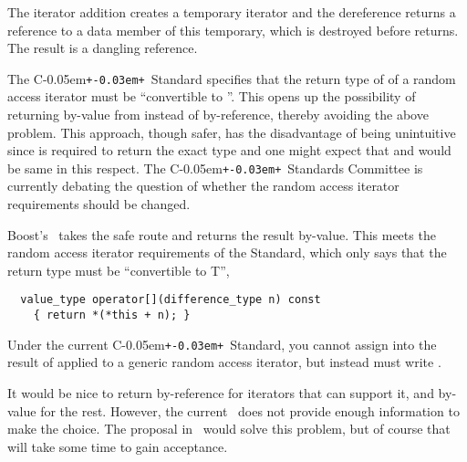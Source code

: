 \documentclass{netobjectdays}
\newcommand{\Cpp}{C\kern-0.05em\texttt{+\kern-0.03em+}}
\newcommand{\iteratoradaptor}{\code{iterator\_\-adaptor}}
\newcommand{\iteratortraits}{\code{iterator\_\-traits}}
\begin{document}
\noindent The iterator addition creates a temporary iterator and the
dereference returns a reference to a data member of this temporary,
which is destroyed before  returns. The result is a
dangling reference.

The \Cpp\ Standard specifies that the return type of 
of a random access iterator must be ``convertible to ''.  This
opens up the possibility of returning by-value from 
instead of by-reference, thereby avoiding the above problem.  This
approach, though safer, has the disadvantage of being unintuitive
since  is required to return the exact type 
and one might expect that  and  would
be same in this respect.  The \Cpp\ Standards Committee is currently
debating the question of whether the random access iterator
requirements should be changed.

Boost's \iteratoradaptor\ takes the safe route and returns the result
by-value. This meets the random access iterator requirements of the
Standard, which only says that the return type must be ``convertible
to T'',

{\footnotesize
\begin{verbatim}
  value_type operator[](difference_type n) const
    { return *(*this + n); }
\end{verbatim}
}

Under the current \Cpp\ Standard, you cannot assign into the result of
 applied to a generic random access iterator,
but instead must write .

It would be nice to return by-reference for iterators that can support
it, and by-value for the rest. However, the current \iteratortraits\
does not provide enough information to make the choice. The proposal
in~\cite{siek01:_improved_iter_cat} would solve this problem, but of
course that will take some time to gain acceptance.



\end{document}
